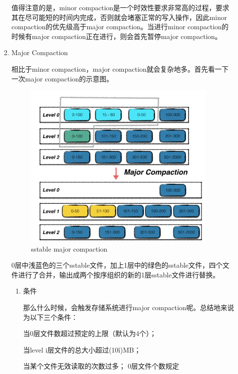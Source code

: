 \begin{enumerate}
\begin{enumerate}
				值得注意的是，minor compaction是一个时效性要求非常高的过程，要求其在尽可能短的时间内完成，否则就会堵塞正常的写入操作，因此minor compaction的优先级高于major compaction。当进行minor compaction的时候有major compaction正在进行，则会首先暂停major compaction。
				
				\item Major Compaction
				
				相比于minor compaction，major compaction就会复杂地多。首先看一下一次major compaction的示意图。
				
				\begin{figure}[H]
					\centering
					\includegraphics[width=0.95\textwidth]{images/major_compaction.jpeg}
					\caption{sstable major compaction}
					\label{sstable_major_compaction}
				\end{figure}
				
				0层中浅蓝色的三个sstable文件，加上1层中的绿色的sstable文件，四个文件进行了合并，输出成两个按序组织的新的1层sstable文件进行替换。
				

				\begin{enumerate}
					\item 条件
					
					那么什么时候，会触发存储系统进行major compaction呢。总结地来说为以下三个条件：
				
				当0层文件数超过预定的上限（默认为4个）；
				
				当level i层文件的总大小超过(10\^i)MB；
				
				当某个文件无效读取的次数过多；
				0层文件个数规定
				

\end{enumerate}
\end{enumerate}
\end{enumerate}
